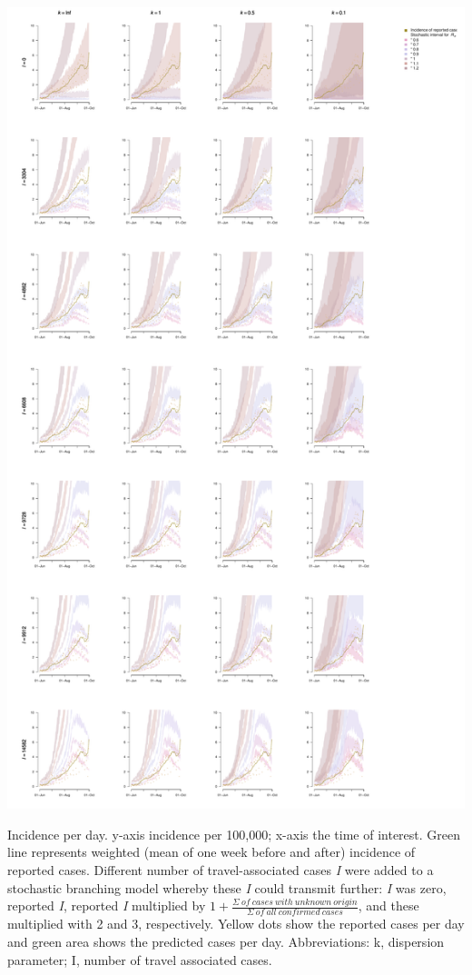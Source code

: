 \documentclass[10pt, a4paper, twoside]{article}
\begin{document}
\begin{suppfigure}[h]
\centering
\includegraphics[scale=0.4]{incidence_sim_imports_infect_2021-03-10.pdf}
\caption{Incidence per day. y-axis incidence per 100,000; x-axis the time of interest. Green line represents weighted (mean of one week before and after) incidence of reported cases. Different number of travel-associated cases \emph{I} were added to a stochastic branching model whereby these \emph{I} could transmit further: \emph{I} was zero, reported \emph{I}, reported \emph{I} multiplied by $1+ \frac{\Sigma ~of ~cases ~with ~unknown ~origin }{\Sigma ~of ~all ~confirmed ~cases}$, and these multiplied with 2 and 3, respectively. Yellow dots show the reported cases per day and green area shows the predicted cases per day. Abbreviations: k, dispersion parameter; I, number of travel associated cases.}
\end{suppfigure}
\end{document}

